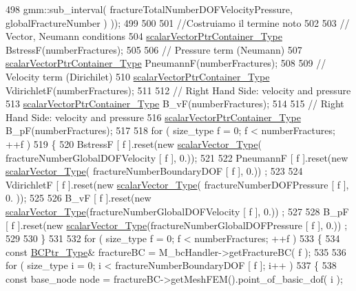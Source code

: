 \begin{DoxyCode}
498             gmm::sub\_interval( fractureTotalNumberDOFVelocityPressure, globalFractureNumber ) ));
499   
500     
501     \textcolor{comment}{//Costruiamo il termine noto}
502     
503     \textcolor{comment}{// Vector, Neumann conditions}
504     \hyperlink{Core_8h_a20f0354ac7b92989514c678f4cdfcb6b}{scalarVectorPtrContainer\_Type} BstressF(numberFractures);
505 
506     \textcolor{comment}{// Pressure term (Neumann)}
507     \hyperlink{Core_8h_a20f0354ac7b92989514c678f4cdfcb6b}{scalarVectorPtrContainer\_Type} PneumannF(numberFractures);
508 
509     \textcolor{comment}{// Velocity term (Dirichilet)}
510     \hyperlink{Core_8h_a20f0354ac7b92989514c678f4cdfcb6b}{scalarVectorPtrContainer\_Type} VdirichletF(numberFractures);
511 
512     \textcolor{comment}{// Right Hand Side: velocity and pressure}
513     \hyperlink{Core_8h_a20f0354ac7b92989514c678f4cdfcb6b}{scalarVectorPtrContainer\_Type} B\_vF(numberFractures);
514 
515     \textcolor{comment}{// Right Hand Side: velocity and pressure}
516     \hyperlink{Core_8h_a20f0354ac7b92989514c678f4cdfcb6b}{scalarVectorPtrContainer\_Type} B\_pF(numberFractures);
517     
518     \textcolor{keywordflow}{for} ( size\_type f = 0; f < numberFractures; ++f )
519     \{
520         BstressF [ f ].reset(\textcolor{keyword}{new} \hyperlink{Core_8h_a4e75b5863535ba1dd79942de2846eff0}{scalarVector\_Type}( fractureNumberGlobalDOFVelocity [ f ],
       0.));
521 
522         PneumannF [ f ].reset(\textcolor{keyword}{new} \hyperlink{Core_8h_a4e75b5863535ba1dd79942de2846eff0}{scalarVector\_Type}( fractureNumberBoundaryDOF [ f ], 0.))
      ;
523 
524         VdirichletF [ f ].reset(\textcolor{keyword}{new} \hyperlink{Core_8h_a4e75b5863535ba1dd79942de2846eff0}{scalarVector\_Type}( fractureNumberDOFPressure [ f ], 0.
      ));
525 
526         B\_vF [ f ].reset(\textcolor{keyword}{new} \hyperlink{Core_8h_a4e75b5863535ba1dd79942de2846eff0}{scalarVector\_Type}(fractureNumberGlobalDOFVelocity [ f ], 0.))
      ;
527 
528         B\_pF [ f ].reset(\textcolor{keyword}{new} \hyperlink{Core_8h_a4e75b5863535ba1dd79942de2846eff0}{scalarVector\_Type}(fractureNumberGlobalDOFPressure [ f ], 0.))
      ;
529         
530     \}
531 
532     \textcolor{keywordflow}{for} ( size\_type f = 0; f < numberFractures; ++f )
533     \{
534         \textcolor{keyword}{const} \hyperlink{BC_8h_a088c36f945ad8f6e7e0c7c423994c6ec}{BCPtr\_Type}& fractureBC = M\_bcHandler->getFractureBC( f );
535 
536         \textcolor{keywordflow}{for} ( size\_type i = 0; i < fractureNumberBoundaryDOF [ f ]; i++ )
537         \{
538             \textcolor{keyword}{const} base\_node node = fractureBC->getMeshFEM().point\_of\_basic\_dof( i );

\end{DoxyCode}
